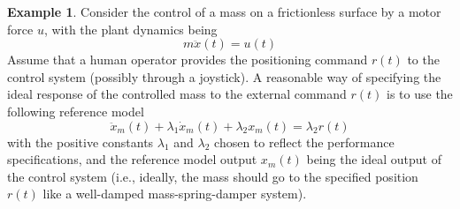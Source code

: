 \documentclass[11pt,a4paper,oneside]{book}
\numberwithin{equation}{section}
\theoremstyle{it}
\theoremstyle{definition}
\newtheorem{example}{Example}[chapter]
\begin{document}
\begin{example}
	Consider the control of a mass on a frictionless surface by a motor force $u$, with the plant dynamics being 
	\begin{equation}\label{slotineli_1}
		m\ddot{x}(t)=u(t)
	\end{equation}  
	Assume that a human operator provides the positioning command $r(t)$ to the control system (possibly through a joystick). A reasonable way of specifying the ideal response of the controlled mass to the external command $r(t)$ is to use the following reference model
	\begin{equation}\label{slotineli_2}
		\ddot{x}_m(t)+\lambda_1\dot{x}_m(t)+\lambda_2x_m(t)=\lambda_2r(t)
	\end{equation}  
	with the positive constants $\lambda_1$ and $\lambda_2$ chosen to reflect the performance specifications, and the reference model output $x_m(t)$ being the ideal output of the control system (i.e., ideally, the mass should go to the specified position $r(t)$ like a well-damped mass-spring-damper system).
	

\end{example}
\end{document}
